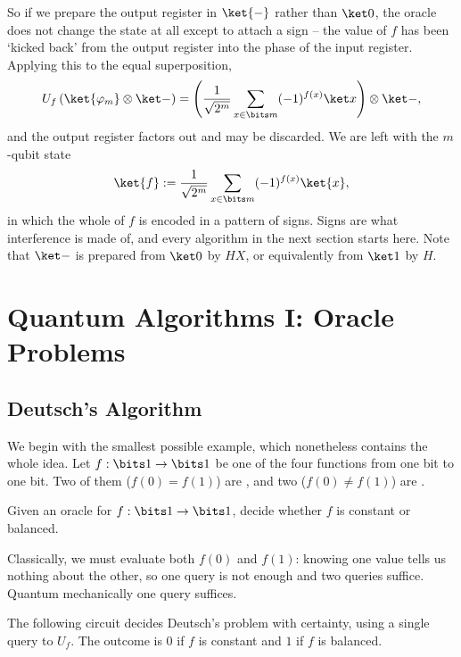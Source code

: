 So if we prepare the output register in $\ket{-}$ rather than $\ket 0$, the oracle does not change the state at all except to attach a sign -- the value of $f$ has been `kicked back' from the output register into the phase of the input register. Applying this to the equal superposition,
$$U_f\left(\ket{\varphi_m}\otimes\ket-\right) = \left(\frac{1}{\sqrt{2^m}}\sum_{x\in\bits m}(-1)^{f(x)}\ket x\right)\otimes\ket-,$$
and the output register factors out and may be discarded. We are left with the $m$-qubit state
$$\ket{f} := \frac1{\sqrt{2^m}}\sum_{x\in\bits m}(-1)^{f(x)}\ket{x},$$
in which the whole of $f$ is encoded in a pattern of signs. Signs are what interference is made of, and every algorithm in the next section starts here. Note that $\ket -$ is prepared from $\ket 0$ by $HX$, or equivalently from $\ket 1$ by $H$.

\section{Quantum Algorithms I: Oracle Problems}\label{sec:algorithms}

\subsection{Deutsch's Algorithm}

We begin with the smallest possible example, which nonetheless contains the whole idea. Let $f : \bits1\to\bits1$ be one of the four functions from one bit to one bit. Two of them ($f(0) = f(1)$) are , and two ($f(0)\neq f(1)$) are .

\begin{problem*}[Deutsch]
	Given an oracle for $f:\bits1\to\bits1$, decide whether $f$ is constant or balanced.
\end{problem*}

Classically, we must evaluate both $f(0)$ and $f(1)$: knowing one value tells us nothing about the other, so one query is not enough and two queries suffice. Quantum mechanically one query suffices.

\begin{proposition}
	The following circuit decides Deutsch's problem with certainty, using a single query to $U_f$. The outcome is $0$ if $f$ is constant and $1$ if $f$ is balanced.
\end{proposition}

\begin{center}
\end{center}

